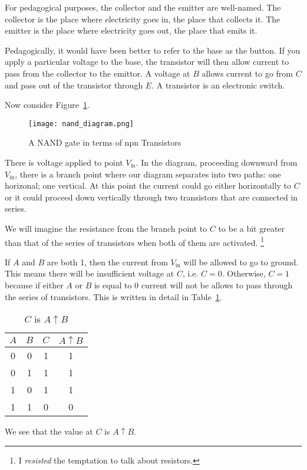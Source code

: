 For pedagogical purposes, the collector and the emitter are well-named.  The collector is the place where electricity goes in, the place that collects it.  The emitter is the place where electricity goes out, the place that emits it.

Pedagogically, it would have been better to refer to the base as the button.  If you apply a particular voltage to the base, the transistor will then allow current to pass from the collector to the emittor.  A voltage at $B$ allows current to go from $C$  and pass out of the transistor through $E$.  A transistor is an electronic switch.

Now consider Figure~\ref{figure:nand_diagram}.
\begin{figure}
	\begin{center}
		\texttt{[image: nand\_diagram.png]}
	\end{center}\caption{A NAND gate in terms of npn Transistors}\label{figure:nand_diagram}
\end{figure}
There is voltage applied to point $V_\text{in}$.  In the diagram, proceeding downward from $V_\text{in}$, there is a branch point where our diagram separates into two paths: one horizonal; one vertical. At this point the current could go either horizontally to $C$ or it could proceed down vertically through two transistors that are connected in series.

We will imagine the resistance from the branch point to $C$ to be a bit greater than that of the series of transistors when both of them are activated. \footnote{I \emph{resisted} the temptation to talk about resistors.}

If $A$ and $B$ are both 1, then the current from $V_\text{in}$ will be allowed to go to ground.  This means there will be insufficient voltage at $C$, i.e. $C=0$.  Otherwise, $C=1$ because if either $A$ or $B$ is equal to 0 current will not be allows to pass through the series of transistors.  This is written in detail in Table~\ref{table:c_is_a_nand_b}.
\begin{table}
	\begin{center}
		\begin{tabular}{cccc}
			$A$ & $B$ & $C$ & $A\uparrow B$ \\ \hline 
			0   & 0   &  1  & 1 \\ 
			0   & 1   &  1  & 1 \\ 
			1   & 0   &  1  & 1 \\ 
			1   & 1   &  0  & 0 									
		\end{tabular}
	\end{center}\caption{$C$ is $A\uparrow B$}\label{table:c_is_a_nand_b}
\end{table}
We see that the value at $C$ is $A\uparrow B$.

